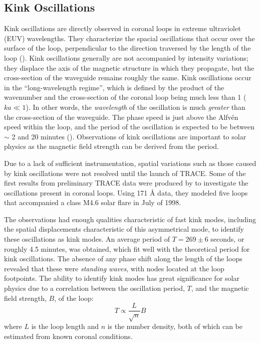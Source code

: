 \documentclass[preprint2]{aastex}
\begin{document}
\subsection{Kink Oscillations}\label{kink}
Kink oscillations are directly observed in coronal loops in extreme
ultraviolet (EUV) wavelengths.
They characterize the spacial oscillations that occur over the surface of
the loop, perpendicular to the direction traversed by the length
of the loop (\cite{Nak}).
Kink oscillations generally are not accompanied by intensity variations;
they displace the axis of the magnetic structure in which they propagate,
but the cross-section of the waveguide remains roughly the same.
Kink oscillations occur in the ``long-wavelength regime'',
which is defined by
the product of the wavenumber and the cross-section of the coronal
loop being much less than 1 ($ka \ll 1$). In other words, the
\emph{wavelength} of the oscillation is much \emph{greater} than the
cross-section of the waveguide.
The phase speed is just above the Alfv\'en speed within the loop,
and the period of the oscillation is expected to be between
$\sim$ 2 and 20 minutes (\cite{Asc}).
Observations of kink oscillations are important to solar physics as
the magnetic field strength can be derived from the period.

Due to a lack of sufficient instrumentation,
spatial variations such as those caused by kink oscillations
were not resolved until the launch of TRACE\@.
Some of the first results from preliminary TRACE data were produced by
\cite{kink_1} to investigate the oscillations present in coronal loops.
Using 171 \AA{} data, they modeled five loops
that accompanied a class M4.6 solar flare in July of 1998.

The observations had enough qualities characteristic of
fast kink modes, including the spatial displacements characteristic
of this asymmetrical mode, to identify these oscillations as kink
modes.
An average period of $T = 269 \pm 6$ seconds, or
roughly 4.5 minutes, was obtained, which fit well with the theoretical
period for kink oscillations.
The absence of any phase
shift along the length of the loops revealed that these were
\emph{standing waves}, with nodes located at the loop footpoints.
The ability to identify kink modes has great significance
for solar physics due to a correlation between the oscillation period,
$T$, and the magnetic field strength, $B$, of the loop:
\begin{equation}
    T \propto \frac{L}{\sqrt{n}}{B}
\end{equation}
where $L$ is the loop length and $n$ is the number density,
both of which can be estimated from known coronal conditions.
\end{document}
